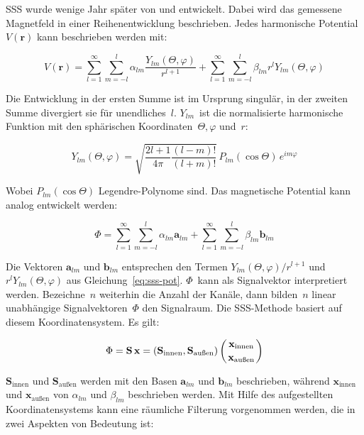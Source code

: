 \documentclass[doc,a4paper,12pt]{apa6}
\newcommand{\mx}[1]{\mathbf{#1}}
\begin{document}
SSS wurde wenige Jahr später von \textcite{taulu2004suppression} und \textcite{taulu2005presentation} entwickelt. Dabei wird das gemessene Magnetfeld in einer Reihenentwicklung beschrieben. Jedes harmonische Potential $V(\mx{r})$ kann beschrieben werden mit:

\begin{equation}
V(\mx{r}) = \sum_{l=1}^\infty \sum_{m=-l}^l \alpha_{lm} \frac{Y_{lm}(\Theta, \varphi)}{r^{l+1}} + \sum_{l=1}^\infty \sum_{m=-l}^l \beta_{lm} r^l Y_{lm}(\Theta, \varphi) 
\label{eq:sss-pot}
\end{equation}

Die Entwicklung in der ersten Summe ist im Ursprung singulär, in der zweiten Summe divergiert sie für unendliches~$l$. $Y_{lm}$~ist die normalisierte harmonische Funktion mit den sphärischen Koordinaten~$\Theta, \varphi$ und~$r$:

\begin{equation}
Y_{lm}(\Theta, \varphi) = \sqrt{\frac{2l+1}{4\pi} \frac{(l-m)!}{(l+m)!}}\, P_{lm}(\cos{\Theta})\,e^{im\varphi}
\end{equation}

Wobei $P_{lm}(\cos{\Theta})$ Legendre-Polynome sind. Das magnetische Potential kann analog entwickelt werden:

\begin{equation}
\Phi = \sum_{l=1}^\infty \sum_{m=-l}^l \alpha_{lm} \mx{a}_{lm} + \sum_{l=1}^\infty \sum_{m=-l}^l \beta_{lm} \mx{b}_{lm}
\label{eq:sss-magpot}
\end{equation}

Die Vektoren $\mx{a}_{lm}$ und $\mx{b}_{lm}$ entsprechen den Termen $Y_{lm}(\Theta, \varphi)/r^{l+1}$ und $r^l Y_{lm}(\Theta, \varphi)$ aus Gleichung~\ref{eq:sss-pot}. $\Phi$~kann als Signalvektor interpretiert werden. Bezeichne~$n$ weiterhin die Anzahl der Kanäle, dann bilden~$n$ linear unabhängige Signalvektoren~$\Phi$ den Signalraum. Die SSS-Methode basiert auf diesem Koordinatensystem. Es gilt:

\begin{equation}
\Phi = \mx{S}\,\mx{x} = \left( \mx{S}_{\text{innen}}, \mx{S}_{\text{außen}} \right) \left( \mx{x}_{\text{innen}} \atop \mx{x}_{\text{außen}} \right)
\end{equation}

$\mx{S}_{\text{innen}}$ und $\mx{S}_{\text{außen}}$ werden mit den Basen $\mx{a}_{lm}$ und $\mx{b}_{lm}$ beschrieben, während $\mx{x}_{\text{innen}}$ und $\mx{x}_{\text{außen}}$ von $\alpha_{lm}$ und $\beta_{lm}$ beschrieben werden. Mit Hilfe des aufgestellten Koordinatensystems kann eine räumliche Filterung vorgenommen werden, die in zwei Aspekten von Bedeutung ist:
\end{document}
